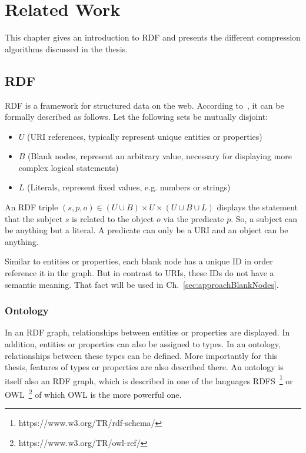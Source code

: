 \chapter{Related Work}\label{ch:related_work}

This chapter gives an introduction to RDF and presents the different compression algorithms discussed in the thesis.

\section{RDF}\label{sec:relatedworkRDF}

RDF is a framework for structured data on the web. According to~\cite{hitzler}, it can be formally described as follows. Let the following sets be mutually disjoint:

\begin{itemize}
	\item $U$ (URI references, typically represent unique entities or properties)
	\item $B$ (Blank nodes, represent an arbitrary value, necessary for displaying more complex logical statements)
	\item $L$ (Literals, represent fixed values, e.g. numbers or strings)
\end{itemize}

An RDF triple $(s,p,o) \in (U \cup B) \times U \times (U\cup B \cup L)$ displays the statement that the subject $s$ is related to the object $o$ via the predicate $p$. So, a subject can be anything but a literal. A predicate can only be a URI and an object can be anything.

Similar to entities or properties, each blank node has a unique ID in order reference it in the graph. But in contrast to URIs, these IDs do not have a semantic meaning. That fact will be used in Ch.~\ref{sec:approachBlankNodes}.

\subsection{Ontology}\label{sec:relatedworkOntology}

In an RDF graph, relationships between entities or properties are displayed. In addition, entities or properties can also be assigned to types. In an ontology, relationships between these types can be defined. More importantly for this thesis, features of types or properties are also described there. An ontology is itself also an RDF graph, which is described in one of the languages \ac{RDFS}~\footnote{https://www.w3.org/TR/rdf-schema/} or \ac{OWL}~\footnote{https://www.w3.org/TR/owl-ref/} of which OWL is the more powerful one.~\cite{hitzler} 

